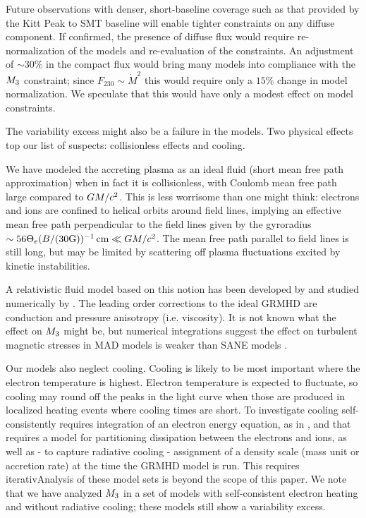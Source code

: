 Future observations with denser, short-baseline coverage such as that provided by the Kitt Peak to SMT baseline will enable tighter constraints on any diffuse component.  If confirmed, the presence of diffuse flux would require re-normalization of the models and re-evaluation of the constraints.  An adjustment of $\sim 30\%$ in the compact flux would bring many models into compliance with the $M_{3}$ constraint; since $F_{230} \sim \dot{M}^2$ this would require only a $15\%$ change in model normalization.  We speculate that this would have only a modest effect on model constraints.

The variability excess might also be a failure in the models.  Two physical effects top our list of suspects: collisionless effects and cooling.  

We have modeled the accreting plasma as an ideal fluid (short mean free path approximation) when in fact it is collisionless, with Coulomb mean free path large compared to $GM/c^2$.  This is less worrisome than one might think: electrons and ions are confined to helical orbits around field lines, implying an effective mean free path perpendicular to the field lines given by the gyroradius $\sim 56 \Theta_e (B/(30 {\rm G}))^{-1} \,\mathrm{cm} \ll GM/c^2$.  The mean free path parallel to field lines is still long, but may be limited by scattering off plasma fluctuations excited by kinetic instabilities.  

A relativistic fluid model based on this notion has been developed by \cite{2015ApJ...810..162C} and studied numerically by \cite{2017MNRAS.470.2240F}.  The leading order corrections to the ideal GRMHD are conduction and pressure anisotropy (i.e. viscosity).  It is not known what the effect on $M_{3}$ might be, but numerical integrations suggest the effect on turbulent magnetic stresses in  MAD models is weaker than SANE models \citep{2017MNRAS.470.2240F}. 

Our models also neglect cooling.  Cooling is likely to be most important where the electron temperature is highest.  Electron temperature is expected to fluctuate, so cooling may round off the peaks in the light curve when those are produced in localized heating events where cooling times are short.  To investigate cooling self-consistently requires integration of an electron energy equation, as in \cite{2015MNRAS.454.1848R}, and that requires a model for partitioning dissipation between the electrons and ions, as well as - to capture radiative cooling - assignment of a density scale (mass unit or accretion rate) at the time the GRMHD model is run.  This requires iterativAnalysis of these model sets is beyond the scope of this paper.  We note that we have analyzed $M_{3}$ in a set of models with self-consistent electron heating and without radiative cooling; these models still show a variability excess.

